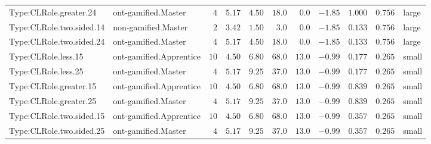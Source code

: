 \documentclass[6pt,a4paper]{article}
\begin{document}
{\begin{longtable}{llrrrrrrrrl}
Type:CLRole.greater.24&ont-gamified.Master&$ 4$&$5.17$&$ 4.50$&$ 18.0$&$ 0.0$&$-1.85$&$1.000$&$0.756$&large\tabularnewline
Type:CLRole.two.sided.14&non-gamified.Master&$ 2$&$3.42$&$ 1.50$&$  3.0$&$ 0.0$&$-1.85$&$0.133$&$0.756$&large\tabularnewline
Type:CLRole.two.sided.24&ont-gamified.Master&$ 4$&$5.17$&$ 4.50$&$ 18.0$&$ 0.0$&$-1.85$&$0.133$&$0.756$&large\tabularnewline
Type:CLRole.less.15&ont-gamified.Apprentice&$10$&$4.50$&$ 6.80$&$ 68.0$&$13.0$&$-0.99$&$0.177$&$0.265$&small\tabularnewline
Type:CLRole.less.25&ont-gamified.Master&$ 4$&$5.17$&$ 9.25$&$ 37.0$&$13.0$&$-0.99$&$0.177$&$0.265$&small\tabularnewline
Type:CLRole.greater.15&ont-gamified.Apprentice&$10$&$4.50$&$ 6.80$&$ 68.0$&$13.0$&$-0.99$&$0.839$&$0.265$&small\tabularnewline
Type:CLRole.greater.25&ont-gamified.Master&$ 4$&$5.17$&$ 9.25$&$ 37.0$&$13.0$&$-0.99$&$0.839$&$0.265$&small\tabularnewline
\newpage
Type:CLRole.two.sided.15&ont-gamified.Apprentice&$10$&$4.50$&$ 6.80$&$ 68.0$&$13.0$&$-0.99$&$0.357$&$0.265$&small\tabularnewline
Type:CLRole.two.sided.25&ont-gamified.Master&$ 4$&$5.17$&$ 9.25$&$ 37.0$&$13.0$&$-0.99$&$0.357$&$0.265$&small\tabularnewline
\hline
\end{longtable}}
\end{document}
